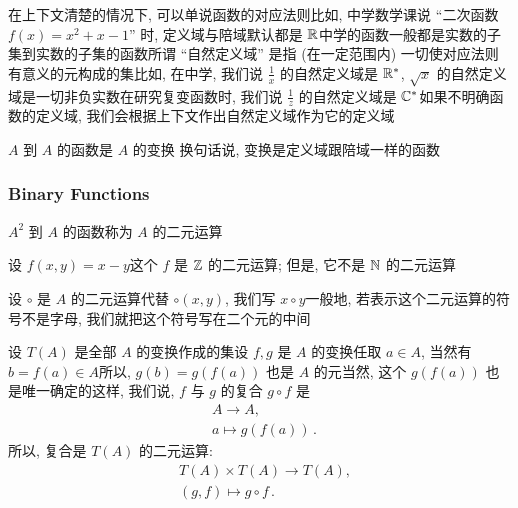 \begin{remark}
    在上下文清楚的情况下, 可以单说函数的对应法则\period 比如, 中学数学课说 ``二次函数 $f(x) = x^2 + x - 1$'' 时, 定义域与陪域默认都是 $\mathbb{R}$\period 中学的函数一般都是实数的子集到实数的子集的函数\period 所谓 ``自然定义域'' 是指 (在一定范围内) 一切使对应法则有意义的元构成的集\period 比如, 在中学, 我们说 $\frac{1}{x}$ 的自然定义域是 $\mathbb{R}^{\ast}$, $\sqrt{x}$ 的自然定义域是一切非负实数\period 在研究复变函数时, 我们说 $\frac{1}{z}$ 的自然定义域是 $\mathbb{C}^{\ast}$\period 如果不明确函数的定义域, 我们会根据上下文作出自然定义域作为它的定义域\period
\end{remark}

\begin{definition}
    $A$ 到 $A$ 的函数是 $A$ 的变换 \period 换句话说, 变换是定义域跟陪域一样的函数\period
\end{definition}

\subsubsection*{Binary Functions}

\begin{definition}
    $A^2$ 到 $A$ 的函数称为 $A$ 的二元运算 \period
\end{definition}

\begin{example}
    设 $f(x,y) = x-y$\period 这个 $f$ 是 $\mathbb{Z}$ 的二元运算; 但是, 它不是 $\mathbb{N}$ 的二元运算\period
\end{example}

\begin{remark}
    设 $\circ$ 是 $A$ 的二元运算\period 代替 $\circ (x,y)$, 我们写 $x \circ y$\period 一般地, 若表示这个二元运算的符号不是字母, 我们就把这个符号写在二个元的中间\period
\end{remark}

\begin{definition}
    设 $T(A)$ 是全部 $A$ 的变换作成的集\period 设 $f,g$ 是 $A$ 的变换\period 任取 $a \in A$, 当然有 $b = f(a) \in A$\period 所以, $g(b) = g(f(a))$ 也是 $A$ 的元\period 当然, 这个 $g(f(a))$ 也是唯一确定的\period 这样, 我们说, $f$ 与 $g$ 的复合  $g \circ f$ 是
    \begin{align*}
         & A \to A, \tag*{$g \circ f \colon$} \\
         & a \mapsto g(f(a)) \period
    \end{align*}
    所以, 复合是 $T(A)$ 的二元运算:
    \begin{align*}
         & T(A) \times T(A) \to T(A), \tag*{$\circ \colon$} \\
         & (g,f) \mapsto g \circ f \period
    \end{align*}
\end{definition}

